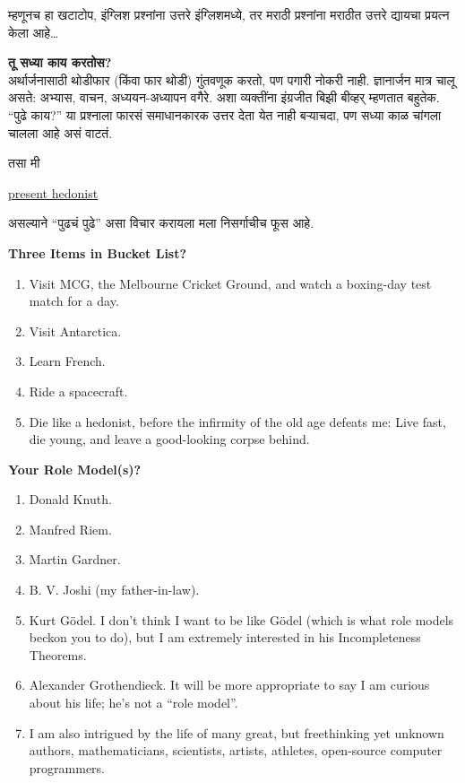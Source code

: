 \documentclass[17pt]{extarticle}  %
\begin{document}
म्हणूनच हा खटाटोप, इंग्लिश प्रश्नांना उत्तरे इंग्लिशमध्ये, तर मराठी प्रश्नांना मराठीत उत्तरे द्यायचा प्रयत्न केला आहे\dots

\begin{enumerate}
\item
\textbf{तू सध्या काय करतोस?}\\
अर्थार्जनासाठी थोडीफार (किंवा फार थोडी) गुंतवणूक करतो, पण पगारी नोकरी नाही. ज्ञानार्जन मात्र चालू असते: अभ्यास, वाचन, अध्ययन-अध्यापन वगैरे. अशा व्यक्तींना इंग्रजीत बिझी बीव्हर् म्हणतात बहुतेक. \enquote{पुढे काय?} या प्रश्नाला फारसं समाधानकारक उत्तर देता येत नाही बऱ्याचदा, पण सध्या काळ चांगला चालला आहे असं वाटतं. 

तसा मी \begin{english} \href{https://en.wikipedia.org/wiki/Hedonism}{present hedonist}\end{english} असल्याने \enquote{पुढचं पुढे} असा विचार करायला मला निसर्गाचीच फूस आहे.

\begin{english}

\item \textbf{Three Items in Bucket List?}\\
\begin{enumerate}
\item Visit MCG, the Melbourne Cricket Ground, and watch a boxing-day test match for a day.
\item Visit Antarctica.
\item Learn French.
\item Ride a spacecraft.
\item Die like a hedonist, before the infirmity of the old age defeats me: Live fast, die young, and leave a good-looking corpse behind.
\end{enumerate}

\item 
\textbf{Your Role Model(s)?}\\
\begin{enumerate}
\item Donald Knuth.
\item Manfred Riem.
\item Martin Gardner.
\item B. V. Joshi (my father-in-law).
\item Kurt G\"odel. I don't think I want to be like G\"odel (which is what role models beckon you to do), but I am extremely interested in his Incompleteness Theorems.
\item Alexander Grothendieck. It will be more appropriate to say I am curious about his life; he's not a \enquote{role model}.
\item I am also intrigued by the life of many great, but freethinking yet unknown authors, mathematicians, scientists, artists, athletes, open-source computer programmers.
\end{enumerate}


\end{english}
\end{enumerate}
\end{document}
